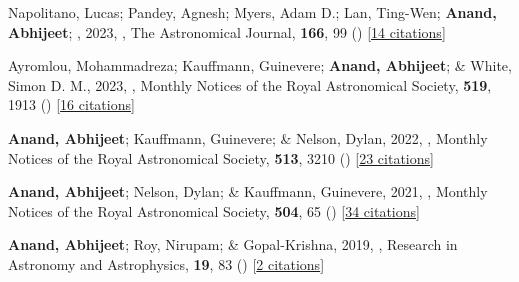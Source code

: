 \item[{\color{numcolor}\scriptsize5}] Napolitano, Lucas; Pandey, Agnesh; Myers, Adam D.; Lan, Ting-Wen; \textbf{Anand, Abhijeet}; \etal, 2023, , The Astronomical Journal, \textbf{166}, 99 () [\href{https://ui.adsabs.harvard.edu/abs/2023AJ....166...99N}{14 citations}]

\item[{\color{numcolor}\scriptsize4}] Ayromlou, Mohammadreza; Kauffmann, Guinevere; \textbf{Anand, Abhijeet}; \& White, Simon D. M., 2023, , Monthly Notices of the Royal Astronomical Society, \textbf{519}, 1913 () [\href{https://ui.adsabs.harvard.edu/abs/2023MNRAS.519.1913A}{16 citations}]

\item[{\color{numcolor}\scriptsize3}] \textbf{Anand, Abhijeet}; Kauffmann, Guinevere; \& Nelson, Dylan, 2022, , Monthly Notices of the Royal Astronomical Society, \textbf{513}, 3210 () [\href{https://ui.adsabs.harvard.edu/abs/2022MNRAS.513.3210A}{23 citations}]

\item[{\color{numcolor}\scriptsize2}] \textbf{Anand, Abhijeet}; Nelson, Dylan; \& Kauffmann, Guinevere, 2021, , Monthly Notices of the Royal Astronomical Society, \textbf{504}, 65 () [\href{https://ui.adsabs.harvard.edu/abs/2021MNRAS.504...65A}{34 citations}]

\item[{\color{numcolor}\scriptsize1}] \textbf{Anand, Abhijeet}; Roy, Nirupam; \& Gopal-Krishna, 2019, , Research in Astronomy and Astrophysics, \textbf{19}, 83 () [\href{https://ui.adsabs.harvard.edu/abs/2019RAA....19...83A}{2 citations}]